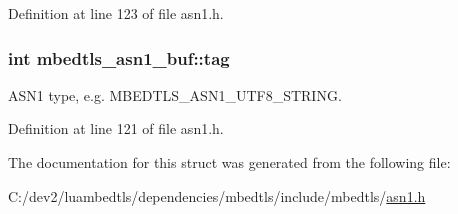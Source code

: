 Definition at line 123 of file asn1.\-h.

\hypertarget{structmbedtls__asn1__buf_abcca2df9a773acd5b59831ac55993dd1}{
\subsubsection[{tag}]{\setlength{\rightskip}{0pt plus 5cm}int mbedtls\-\_\-asn1\-\_\-buf\-::tag}}\label{structmbedtls__asn1__buf_abcca2df9a773acd5b59831ac55993dd1}
A\-S\-N1 type, e.\-g. M\-B\-E\-D\-T\-L\-S\-\_\-\-A\-S\-N1\-\_\-\-U\-T\-F8\-\_\-\-S\-T\-R\-I\-N\-G. 

Definition at line 121 of file asn1.\-h.



The documentation for this struct was generated from the following file\-:\begin{DoxyCompactItemize}
\item 
C\-:/dev2/luambedtls/dependencies/mbedtls/include/mbedtls/\hyperlink{asn1_8h}{asn1.\-h}\end{DoxyCompactItemize}
